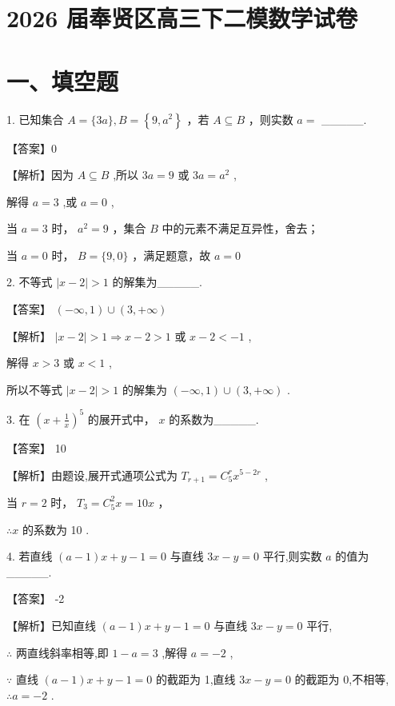\documentclass[10pt]{article}
\begin{document}
\section*{2026 届奉贤区高三下二模数学试卷}

\section*{一、填空题}

1. 已知集合 \(A = \{ {3a}\} ,B = \left\{  {9,{a}^{2}}\right\}\) ，若 \(A \subseteq  B\) ，则实数 \(a =\) \_\_\_\_\_.

【答案】0

【解析】因为 \(A \subseteq  B\) ,所以 \({3a} = 9\) 或 \({3a} = {a}^{2}\) ,

解得 \(a = 3\) ,或 \(a = 0\) ,

当 \(a = 3\) 时， \({a}^{2} = 9\) ，集合 \(B\) 中的元素不满足互异性，舍去；

当 \(a = 0\) 时， \(B = \{ 9,0\}\) ，满足题意，故 \(a = 0\)

2. 不等式 \(\left| {x - 2}\right|  > 1\) 的解集为\_\_\_\_\_.

【答案】 \(\left( {-\infty ,1}\right)  \cup  \left( {3, + \infty }\right)\)

【解析】 \(\left| {x - 2}\right|  > 1 \Rightarrow  x - 2 > 1\) 或 \(x - 2 <  - 1\) ,

解得 \(x > 3\) 或 \(x < 1\) ,

所以不等式 \(\left| {x - 2}\right|  > 1\) 的解集为 \(\left( {-\infty ,1}\right)  \cup  \left( {3, + \infty }\right)\) .

3. 在 \({\left( x + \frac{1}{x}\right) }^{5}\) 的展开式中， \(x\) 的系数为\_\_\_\_\_.

【答案】 10

【解析】由题设,展开式通项公式为 \({T}_{r + 1} = {C}_{5}^{r}{x}^{5 - {2r}}\) ,

当 \(r = 2\) 时， \({T}_{3} = {C}_{5}^{2}x = {10x}\) ，

\(\therefore x\) 的系数为 10 .

4. 若直线 \(\left( {a - 1}\right) x + y - 1 = 0\) 与直线 \({3x} - y = 0\) 平行,则实数 \(a\) 的值为\_\_\_\_\_.

【答案】 -2

【解析】已知直线 \(\left( {a - 1}\right) x + y - 1 = 0\) 与直线 \({3x} - y = 0\) 平行,

\(\therefore\) 两直线斜率相等,即 \(1 - a = 3\) ,解得 \(a =  - 2\) ,

\(\because\) 直线 \(\left( {a - 1}\right) x + y - 1 = 0\) 的截距为 1,直线 \({3x} - y = 0\) 的截距为 0,不相等, \(\therefore a =  - 2\) .
\end{document}
